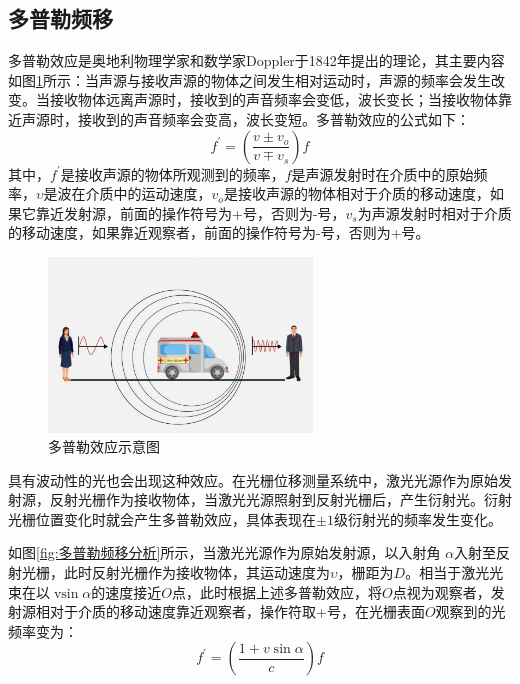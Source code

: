 \documentclass[type=master,oneside]{fduthesis}
\begin{document}
\subsection{多普勒频移}
多普勒效应\cite{giordano2012college}是奥地利物理学家和数学家Doppler于1842年提出的理论，其主要内容如图\ref{fig:多普勒效应示意图}所示：当声源与接收声源的物体之间发生相对运动时，声源的频率会发生改变。当接收物体远离声源时，接收到的声音频率会变低，波长变长；当接收物体靠近声源时，接收到的声音频率会变高，波长变短。多普勒效应的公式\cite{shi2018superlight}如下：
\begin{equation}
  f^{\prime}=\left(\frac{v \pm v_{o}}{v \mp v_{s}}\right) f
\end{equation}
其中，$f^{\prime}$是接收声源的物体所观测到的频率，$f$是声源发射时在介质中的原始频率，$\upsilon $是波在介质中的运动速度，$v_{o}$是接收声源的物体相对于介质的移动速度，如果它靠近发射源，前面的操作符号为+号，否则为-号，$v_{s}$为声源发射时相对于介质的移动速度，如果靠近观察者，前面的操作符号为-号，否则为+号。
\begin{figure}[htb]
  \centering
  \includegraphics[width=7cm]{2-fig/多普勒效应.jpeg}
  \caption{多普勒效应示意图}
  \label{fig:多普勒效应示意图}
\end{figure}

具有波动性的光也会出现这种效应。在光栅位移测量系统中，激光光源作为原始发射源，反射光栅作为接收物体，当激光光源照射到反射光栅后，产生衍射光。衍射光栅位置变化时就会产生多普勒效应，具体表现在$\pm 1$级衍射光的频率发生变化。

如图\ref{fig:多普勒频移分析}所示，当激光光源作为原始发射源，以入射角 $ \alpha $入射至反射光栅，此时反射光栅作为接收物体，其运动速度为$ \upsilon $，栅距为$D$。相当于激光光束在以$\operatorname{vsin} \alpha$的速度接近$ O $点，此时根据上述多普勒效应，将$ O $点视为观察者，发射源相对于介质的移动速度靠近观察者，操作符取+号，在光栅表面$ O $观察到的光频率变为：
\begin{equation}
  f^{\prime}=\left(\frac{1+v \sin \alpha}{c}\right)f
\end{equation}
\end{document}
